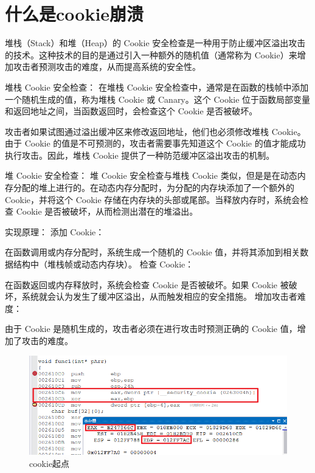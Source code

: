 \documentclass[AutoFakeBold,AutoFakeSlant]{beamer}
\begin{document}
	\section{什么是cookie崩溃}
	\begin{frame}[fragile]
		\tiny
		堆栈（Stack）和堆（Heap）的 Cookie 安全检查是一种用于防止缓冲区溢出攻击的技术。这种技术的目的是通过引入一种额外的随机值（通常称为 Cookie）来增加攻击者预测攻击的难度，从而提高系统的安全性。
		
		堆栈 Cookie 安全检查：
		在堆栈 Cookie 安全检查中，通常是在函数的栈帧中添加一个随机生成的值，称为堆栈 Cookie 或 Canary。这个 Cookie 位于函数局部变量和返回地址之间，当函数返回时，会检查这个 Cookie 是否被破坏。
		
		攻击者如果试图通过溢出缓冲区来修改返回地址，他们也必须修改堆栈 Cookie。由于 Cookie 的值是不可预测的，攻击者需要事先知道这个 Cookie 的值才能成功执行攻击。因此，堆栈 Cookie 提供了一种防范缓冲区溢出攻击的机制。
		
		堆 Cookie 安全检查：
		堆 Cookie 安全检查与堆栈 Cookie 类似，但是是在动态内存分配的堆上进行的。在动态内存分配时，为分配的内存块添加了一个额外的 Cookie，并将这个 Cookie 存储在内存块的头部或尾部。当释放内存时，系统会检查 Cookie 是否被破坏，从而检测出潜在的堆溢出。
		
		实现原理：
		添加 Cookie：
		
		在函数调用或内存分配时，系统生成一个随机的 Cookie 值，并将其添加到相关数据结构中（堆栈帧或动态内存块）。
		检查 Cookie：
		
		在函数返回或内存释放时，系统会检查 Cookie 是否被破坏。如果 Cookie 被破坏，系统就会认为发生了缓冲区溢出，从而触发相应的安全措施。
		增加攻击者难度：
		
		由于 Cookie 是随机生成的，攻击者必须在进行攻击时预测正确的 Cookie 值，增加了攻击的难度。
		
	\end{frame}
	
	\begin{frame} 
		\normalsize
		\begin{figure}
			\centering %
			\includegraphics[width=\linewidth]{1211cookie01}
			\caption{cookie起点}
			\label{fig:cookie01}
		\end{figure}
	\end{frame}
	
\end{document}

